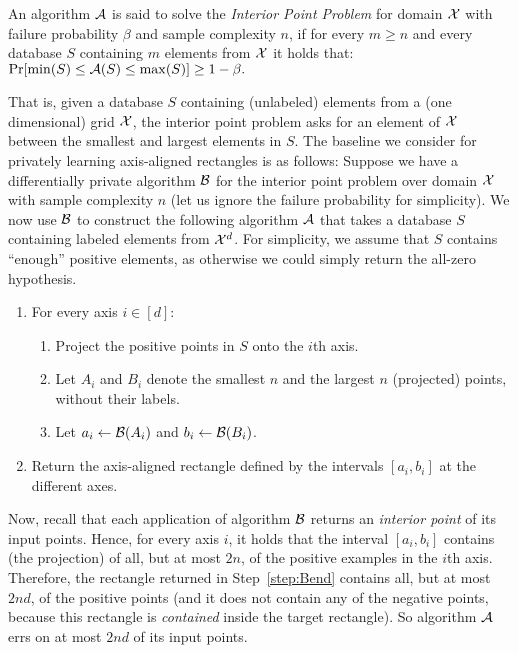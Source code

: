 \documentclass[12pt,a4paper,oneside,onecolumn]{book}
\begin{document}
\begin{definition}
An algorithm $\mathcal{A}$ is said to solve the 
\emph{Interior Point Problem} for domain $\mathcal{X}$
with failure probability $\beta$ and sample complexity $n$,
if for every $m\geq n$ and every database $S$ containing $m$ elements from $\mathcal{X}$ it holds that:
$
\Pr[\min(S) \leq \mathcal{A}(S) \leq \max(S)] \geq 1-\beta.
$
\end{definition}
That is, given a database $S$ containing (unlabeled) elements from a (one dimensional) grid $\mathcal{X}$, the interior point problem asks for an element of $\mathcal{X}$ between the smallest and largest elements in $S$. 
The baseline we consider for privately learning axis-aligned rectangles is as follows: Suppose we have a differentially private algorithm $\mathcal{B}$ for the interior point problem over domain $\mathcal{X}$ with sample complexity $n$ (let us ignore the failure probability for simplicity). We now use $\mathcal{B}$ to construct the following algorithm $\mathcal{A}$ that takes a database $S$ containing labeled elements from $\mathcal{X}^d$. For simplicity, we assume that $S$ contains ``enough'' positive elements, as otherwise we could simply return the all-zero hypothesis.

\begin{enumerate}[leftmargin=15pt]
    \item For every axis $i\in[d]$:
        \begin{enumerate}
        \item Project the positive points in $S$ onto the $i$th axis.
        \item Let $A_i$ and $B_i$ denote the smallest $n$ and the largest $n$ (projected) points, without their labels.
        \item Let $a_i\leftarrow\mathcal{B}(A_i)$ and $b_i\leftarrow\mathcal{B}(B_i)$.
    \end{enumerate}
    \item\label{step:Bend} Return the axis-aligned rectangle defined by the intervals $[a_i,b_i]$ at the different axes.
\end{enumerate}

Now, recall that each application of algorithm $\mathcal{B}$ returns an {\em interior point} of its input points. Hence, for every axis $i$, it holds that the interval $[a_i,b_i]$ contains (the projection) of all, but at most $2n$, of the positive examples in the $i$th axis. Therefore, the rectangle returned in Step~\ref{step:Bend} contains all, but at most $2nd$, of the positive points (and it does not contain any of the negative points, because this rectangle is {\em contained} inside the target rectangle). So algorithm $\mathcal{A}$ errs on at most $2nd$ of its input points. 
\end{document}
